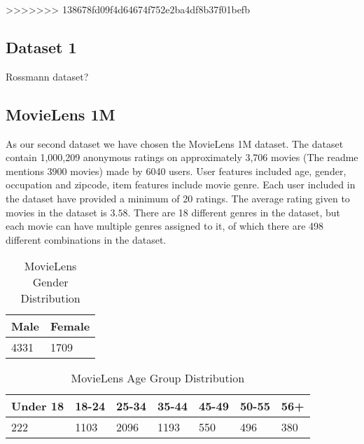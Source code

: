 >>>>>>> 138678fd09f4d64674f752e2ba4df8b37f01befb

\subsection{Dataset 1}

Rossmann dataset?

\subsection{MovieLens 1M}

As our second dataset we have chosen the MovieLens 1M dataset. The dataset contain 1,000,209 anonymous ratings on approximately 3,706 movies (The readme mentions 3900 movies) made by 6040 users. User features included age, gender, occupation and zipcode, item features include movie genre. Each user included in the dataset have provided a minimum of 20 ratings. The average rating given to movies in the dataset is $3.58$. There are 18 different genres in the dataset, but each movie can have multiple genres assigned to it, of which there are 498 different combinations in the dataset.

\begin{table}
\centering
\begin{tabular}{|l|l|}
\hline
Male & Female \\ \hline
4331 & 1709 \\ \hline
\end{tabular}
\caption{MovieLens Gender Distribution}
\end{table}

\begin{table}
\centering
\begin{tabular}{|l|l|l|l|l|l|l|}
\hline
Under 18 & 18-24 & 25-34 	& 35-44 	& 45-49 & 50-55 & 56+ \\ \hline
222		 &	1103 &	2096	&	1193	& 550	& 496	& 380 \\ \hline
\end{tabular}
\caption{MovieLens Age Group Distribution}
\end{table}

